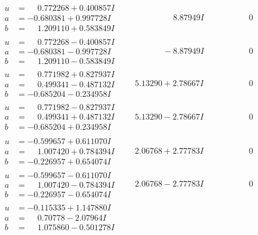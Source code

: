 \documentclass[1p]{elsarticle_modified}
\theoremstyle{definition}
\begin{document}
$$\begin{array}{c|c|c}
\begin{aligned}
u &= \phantom{-}0.772268 + 0.400857 I \\
a &= -0.680381 + 0.997728 I \\
b &= \phantom{-}1.209110 + 0.583849 I\end{aligned}
 & \phantom{-0.000000 -}8.87949 I & \phantom{-0.000000 } 0 \\ \hline\begin{aligned}
u &= \phantom{-}0.772268 - 0.400857 I \\
a &= -0.680381 - 0.997728 I \\
b &= \phantom{-}1.209110 - 0.583849 I\end{aligned}
 & \phantom{-0.000000 } -8.87949 I & \phantom{-0.000000 } 0 \\ \hline\begin{aligned}
u &= \phantom{-}0.771982 + 0.827937 I \\
a &= \phantom{-}0.499341 - 0.487132 I \\
b &= -0.685204 - 0.234958 I\end{aligned}
 & \phantom{-}5.13290 + 2.78667 I & \phantom{-0.000000 } 0 \\ \hline\begin{aligned}
u &= \phantom{-}0.771982 - 0.827937 I \\
a &= \phantom{-}0.499341 + 0.487132 I \\
b &= -0.685204 + 0.234958 I\end{aligned}
 & \phantom{-}5.13290 - 2.78667 I & \phantom{-0.000000 } 0 \\ \hline\begin{aligned}
u &= -0.599657 + 0.611070 I \\
a &= \phantom{-}1.007420 + 0.784394 I \\
b &= -0.226957 + 0.654074 I\end{aligned}
 & \phantom{-}2.06768 + 2.77783 I & \phantom{-0.000000 } 0 \\ \hline\begin{aligned}
u &= -0.599657 - 0.611070 I \\
a &= \phantom{-}1.007420 - 0.784394 I \\
b &= -0.226957 - 0.654074 I\end{aligned}
 & \phantom{-}2.06768 - 2.77783 I & \phantom{-0.000000 } 0 \\ \hline\begin{aligned}
u &= -0.115335 + 1.147880 I \\
a &= \phantom{-}0.70778 - 2.07964 I \\
b &= \phantom{-}1.075860 - 0.501278 I\end{aligned}

\end{array}$$
\end{document}
